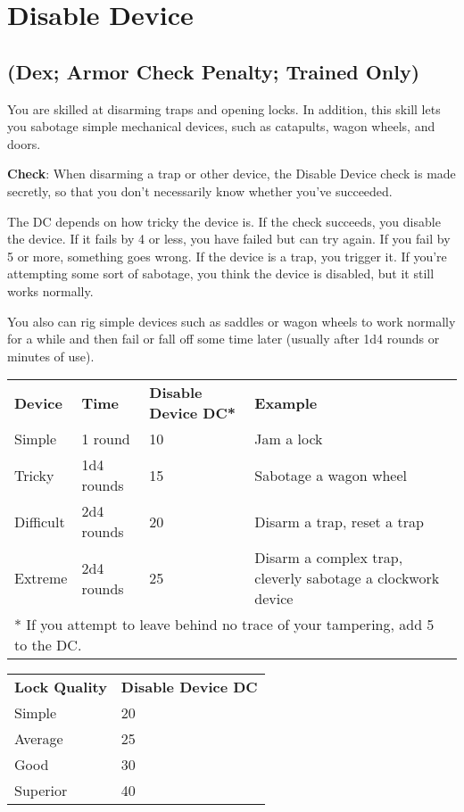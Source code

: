 \section{Disable Device}

\label{f0}				
\subsection{(Dex; Armor Check Penalty; Trained Only)}

				
You are skilled at disarming traps and opening locks. In addition, this skill lets you sabotage simple mechanical devices, such as catapults, wagon wheels, and doors.
				
\textbf{Check}: When disarming a trap or other device, the Disable Device check is made secretly, so that you don't necessarily know whether you've succeeded.
				
The DC depends on how tricky the device is. If the check succeeds, you disable the device. If it fails by 4 or less, you have failed but can try again. If you fail by 5 or more, something goes wrong. If the device is a trap, you trigger it. If you're attempting some sort of sabotage, you think the device is disabled, but it still works normally.
				
You also can rig simple devices such as saddles or wagon wheels to work normally for a while and then fail or fall off some time later (usually after 1d4 rounds or minutes of use).
				

\begin{table}
 \sffamily
 \begin{tabular}{llll}
\textbf{Device} & \textbf{Time} & \textbf{Disable Device DC*} & \textbf{Example}\\
Simple & 1 round & 10 & Jam a lock\\
Tricky & 1d4 rounds & 15 & Sabotage a wagon wheel\\
Difficult & 2d4 rounds & 20 & Disarm a trap, reset a trap\\
Extreme & 2d4 rounds & 25 & Disarm a complex trap, cleverly sabotage a clockwork device\\
\multicolumn{4}{l}{* If you attempt to leave behind no trace of your tampering, add 5 to the DC.}
 \end{tabular}

\end{table}

\begin{table}
\sffamily
 \begin{tabular}{ll}
\textbf{Lock Quality} & \textbf{Disable Device DC} \\
Simple & 20\\
Average & 25\\
Good & 30\\
Superior & 40\\  
 \end{tabular}
\end{table}
				
